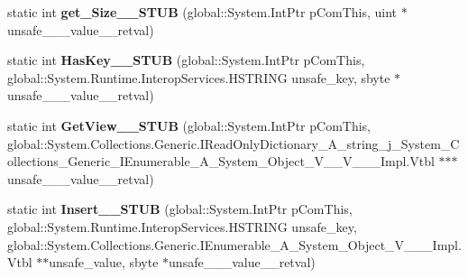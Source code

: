\begin{DoxyCompactItemize}
static int {\bfseries get\+\_\+\+Size\+\_\+\+\_\+\+S\+T\+UB} (global\+::\+System.\+Int\+Ptr p\+Com\+This, uint $\ast$unsafe\+\_\+\+\_\+\+\_\+value\+\_\+\+\_\+retval)
\item 
\mbox{\label{struct_system_1_1_collections_1_1_generic_1_1_i_dictionary___a__string__j___system___collectionsedc27740e4e948ffc8828d48179ed85a_a60ece21f6e529083c854e0b876b51b55}} 
static int {\bfseries Has\+Key\+\_\+\+\_\+\+S\+T\+UB} (global\+::\+System.\+Int\+Ptr p\+Com\+This, global\+::\+System.\+Runtime.\+Interop\+Services.\+H\+S\+T\+R\+I\+NG unsafe\+\_\+key, sbyte $\ast$unsafe\+\_\+\+\_\+\+\_\+value\+\_\+\+\_\+retval)
\item 
\mbox{\label{struct_system_1_1_collections_1_1_generic_1_1_i_dictionary___a__string__j___system___collectionsedc27740e4e948ffc8828d48179ed85a_a185cae3598daadd7bc2c99b2ac7a7434}} 
static int {\bfseries Get\+View\+\_\+\+\_\+\+S\+T\+UB} (global\+::\+System.\+Int\+Ptr p\+Com\+This, global\+::\+System.\+Collections.\+Generic.\+I\+Read\+Only\+Dictionary\+\_\+\+A\+\_\+string\+\_\+j\+\_\+\+System\+\_\+\+Collections\+\_\+\+Generic\+\_\+\+I\+Enumerable\+\_\+\+A\+\_\+\+System\+\_\+\+Object\+\_\+\+V\+\_\+\+\_\+\+V\+\_\+\+\_\+\+\_\+\+Impl.\+Vtbl $\ast$$\ast$$\ast$unsafe\+\_\+\+\_\+\+\_\+value\+\_\+\+\_\+retval)
\item 
\mbox{\label{struct_system_1_1_collections_1_1_generic_1_1_i_dictionary___a__string__j___system___collectionsedc27740e4e948ffc8828d48179ed85a_a778408d04ad40a4e8d48ddc8dfc26d16}} 
static int {\bfseries Insert\+\_\+\+\_\+\+S\+T\+UB} (global\+::\+System.\+Int\+Ptr p\+Com\+This, global\+::\+System.\+Runtime.\+Interop\+Services.\+H\+S\+T\+R\+I\+NG unsafe\+\_\+key, global\+::\+System.\+Collections.\+Generic.\+I\+Enumerable\+\_\+\+A\+\_\+\+System\+\_\+\+Object\+\_\+\+V\+\_\+\+\_\+\+\_\+\+Impl.\+Vtbl $\ast$$\ast$unsafe\+\_\+value, sbyte $\ast$unsafe\+\_\+\+\_\+\+\_\+value\+\_\+\+\_\+retval)
\item 
\mbox{\label{struct_system_1_1_collections_1_1_generic_1_1_i_dictionary___a__string__j___system___collectionsedc27740e4e948ffc8828d48179ed85a_a2c8421cc4dc71f6a9ae0f30c1c9616cc}} 
$$
\end{DoxyCompactItemize}
